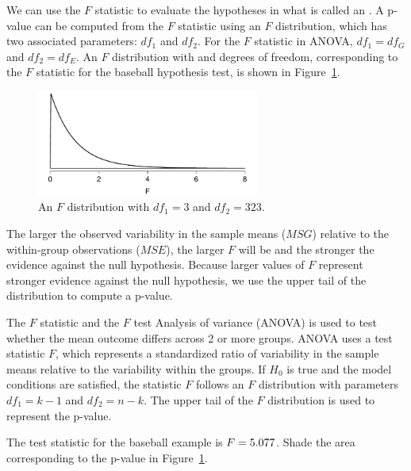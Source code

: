 We can use the $F$ statistic to evaluate the hypotheses in what is called an .
A p-value can be computed from the $F$ statistic using an $F$ distribution, which has two associated parameters: $df_{1}$ and $df_{2}$.
For the $F$ statistic in ANOVA, $df_{1} = df_{G}$ and $df_{2} = df_{E}$.
An $F$ distribution with \mlbDFA{} and \mlbDFB{} degrees of freedom, corresponding to the $F$ statistic for the baseball hypothesis test, is shown in Figure~\ref{fDist2And423}.

\begin{figure}[ht]
\centering
\includegraphics[width=0.65\textwidth]{ch_inference_for_means/figures/fDist2And423/fDist2And423}
\caption{An $F$ distribution with $df_1=3$ and $df_2=323$.}
\label{fDist2And423}
\end{figure}

The larger the observed variability in the sample means ($MSG$) relative to the within-group observations ($MSE$), the larger $F$ will be and the stronger the evidence against the null hypothesis. Because larger values of $F$ represent stronger evidence against the null hypothesis, we use the upper tail of the distribution to compute a p-value.

\begin{onebox}{The $F$ statistic and the $F$ test}
Analysis of variance (ANOVA) is used to test whether the mean outcome differs across 2 or more groups. ANOVA uses a test statistic $F$, which represents a standardized ratio of variability in the sample means relative to the variability within the groups. If $H_0$ is true and the model conditions are satisfied, the statistic $F$ follows an $F$ distribution with parameters $df_{1}=k-1$ and $df_{2}=n-k$. The upper tail of the $F$ distribution is used to represent the p-value.
\end{onebox}

\begin{exercisewrap}
\begin{nexercise}
\label{describePValueAreaForFDistributionInMLBOBPExample}%
The test statistic for the baseball example is $F = 5.077{}$. Shade the area corresponding to the p-value in Figure~\ref{fDist2And423}. \footnotemark{}
\end{nexercise}
\end{exercisewrap}

